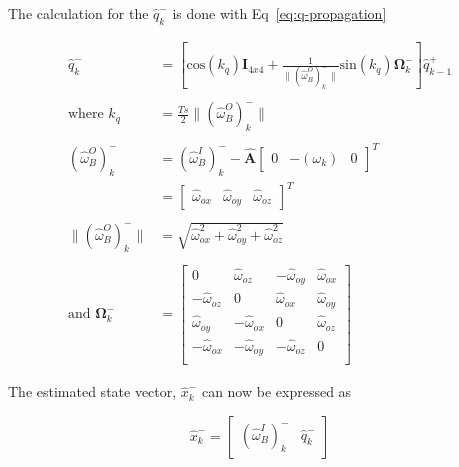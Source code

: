The calculation for the $\hat{q}_k^-$ is done with Eq~\ref{eq:q-propagation} \cite{JansevanVuuren2015}

\begin{equation}
	\begin{aligned}
		\hat{q}_k^- &= \left[\text{cos}(k_q)\mathbf{I}_{4x4} + \frac{1}{\lVert (\hat{\omega}_B^O)_k^- \rVert} \text{sin}(k_q) \mathbf{\Omega}_k^- \right] \hat{q}_{k-1}^+ \\ \\
		\text{where } k_q &= \frac{Ts}{2} \lVert (\hat{\omega}_B^O)_k^- \rVert \\ \\
		(\hat{\omega}_B^O)_k^- &= (\hat{\omega}_B^I)_k^- - \hat{\boldsymbol{A}} \begin{bmatrix} 0 & -(\omega_k) & 0\end{bmatrix}^T \\
		&= \begin{bmatrix} \hat{\omega}_{ox} & \hat{\omega}_{oy}  & \hat{\omega}_{oz} \end{bmatrix}^T \\ \\
		\lVert (\hat{\omega}_B^O)_k^- \rVert &= \sqrt{\hat{\omega}_{ox}^2 + \hat{\omega}_{oy}^2 + \hat{\omega}_{oz}^2} \\ \\
		\text{and } \mathbf{\Omega}_k^- &= \begin{bmatrix} 
			0 & \hat{\omega}_{oz} & -\hat{\omega}_{oy} & \hat{\omega}_{ox} \\
			-\hat{\omega}_{oz} & 0 & \hat{\omega}_{ox} & \hat{\omega}_{oy}			\\
			\hat{\omega}_{oy} & -\hat{\omega}_{ox} & 0 & \hat{\omega}_{oz}			\\
			-\hat{\omega}_{ox} & -\hat{\omega}_{oy} & -\hat{\omega}_{oz} & 0			\\
		\end{bmatrix}
	\end{aligned}
	\label{eq:q-propagation}
\end{equation}

The estimated state vector, $\hat{x}_k^-$ can now be expressed as 

\begin{equation}
	\hat{x}_k^- = \begin{bmatrix} (\hat{\omega}_B^I)_k^- & \hat{q}_k^-\end{bmatrix}
\end{equation}

